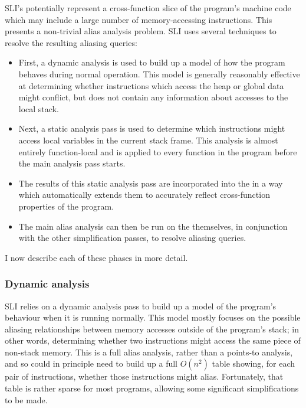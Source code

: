 SLI's {\StateMachines} potentially represent a cross-function slice of
the program's machine code which may include a large number of
memory-accessing instructions.  This presents a non-trivial alias
analysis problem.  SLI uses several techniques to resolve the
resulting aliasing queries:

\begin{itemize}
\item
  First, a dynamic analysis is used to build up a model of how the
  program behaves during normal operation.  This model is generally
  reasonably effective at determining whether instructions which
  access the heap or global data might conflict, but does not contain
  any information about accesses to the local stack.
\item
  Next, a static analysis pass is used to determine which instructions
  might access local variables in the current stack frame.  This
  analysis is almost entirely function-local and is applied to every
  function in the program before the main analysis pass
  starts.
\item
  The results of this static analysis pass are incorporated into the
  {\StateMachines} in a way which automatically extends them to
  accurately reflect cross-function properties of the program.
\item
  The main alias analysis can then be run on the {\StateMachines}
  themselves, in conjunction with the other {\StateMachine}
  simplification passes, to resolve aliasing queries.
\end{itemize}

I now describe each of these phases in more detail.

\subsubsection{Dynamic analysis}

SLI relies on a dynamic analysis pass to build up a model of the
program's behaviour when it is running normally.  This model mostly
focuses on the possible aliasing relationships between memory accesses
outside of the program's stack; in other words, determining whether
two instructions might access the same piece of non-stack memory.
This is a full alias analysis, rather than a points-to analysis, and
so could in principle need to build up a full $O(n^2)$ table showing,
for each pair of instructions, whether those instructions might alias.
Fortunately, that table is rather sparse for most programs, allowing
some significant simplifications to be made.

